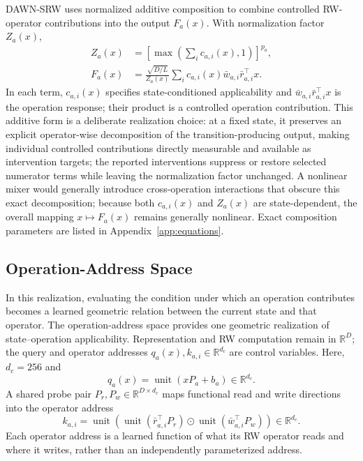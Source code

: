 \documentclass{article}
\newcommand{\R}{\mathbb{R}}
\newcommand{\od}{\mathbin{\odot}}
\newcommand{\DAWN}{DAWN-SRW}
\begin{document}
\DAWN{} uses normalized additive composition to combine controlled RW-operator
contributions into the output \(F_a(x)\). With normalization factor \(Z_a(x)\),
\begin{align}
Z_a(x)&=\left[\max\!\left(\sum_i c_{a,i}(x),1\right)\right]^{p_a},\\
F_a(x)&=\frac{\sqrt{D/L}}{Z_a(x)}
\sum_i c_{a,i}(x)\bar w_{a,i}\bar r_{a,i}^{\top}x.
\label{eq:implemented_composition}
\end{align}
In each term, \(c_{a,i}(x)\) specifies state-conditioned applicability and
\(\bar w_{a,i}\bar r_{a,i}^{\top}x\) is the operation response; their product is
a controlled operation contribution. This additive form is a deliberate
realization choice: at a fixed state, it preserves an explicit operator-wise
decomposition of the transition-producing output, making individual controlled
contributions directly measurable and available as intervention targets; the
reported interventions suppress or restore selected numerator terms while
leaving the normalization factor unchanged. A nonlinear mixer would generally
introduce cross-operation interactions that obscure this exact decomposition;
because both \(c_{a,i}(x)\) and \(Z_a(x)\) are state-dependent, the overall mapping
\(x\mapsto F_a(x)\) remains generally nonlinear. Exact composition parameters
are listed in Appendix~\ref{app:equations}.

\subsection{Operation-Address Space}
\label{sec:operation-space}

In this realization, evaluating the condition under which an operation
contributes becomes a learned geometric relation between the current state and
that operator. The operation-address space provides one geometric realization
of state--operation applicability. Representation and RW computation
remain in \(\R^D\); the query and operator addresses
\(q_a(x),k_{a,i}\in\R^{d_c}\) are control variables. Here, \(d_c=256\) and
\begin{equation}
q_a(x)=\operatorname{unit}(xP_a+b_a)\in\R^{d_c}.
\label{eq:query}
\end{equation}
A shared probe pair \(P_r,P_w\in\R^{D\times d_c}\) maps functional read and
write directions into the operator address
\begin{equation}
k_{a,i}=\operatorname{unit}\!\left(
\operatorname{unit}(\bar r_{a,i}^{\top}P_r)\od
\operatorname{unit}(\bar w_{a,i}^{\top}P_w)\right)\in\R^{d_c}.
\label{eq:rw_address}
\end{equation}
Each operator address is a learned function of what its RW operator reads and
where it writes, rather than an independently parameterized address.
\end{document}
